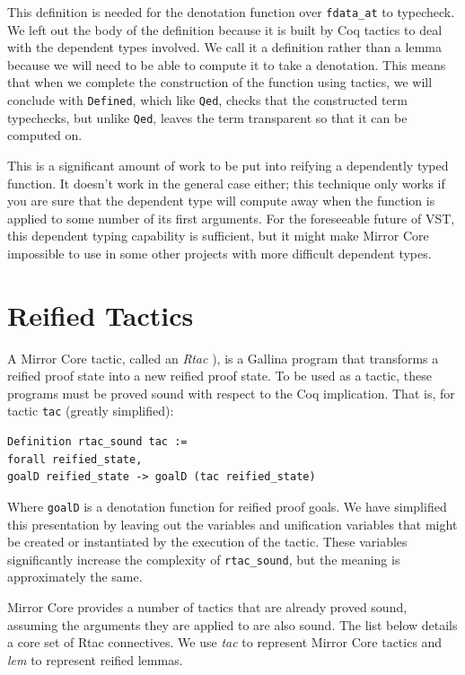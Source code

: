 \documentclass{puthesis}
\begin{document}
This definition is needed for the denotation function over
\lstinline|fdata_at| to typecheck.
We left out the body of the definition because it is built by Coq
tactics to deal with the dependent types involved. We call it a
definition rather than a lemma because we will need to be able to
compute it to take a denotation. This means that when we complete the
construction of the function using tactics, we will conclude with 
\lstinline|Defined|, which like \lstinline|Qed|, checks that the
constructed term typechecks, but unlike \lstinline|Qed|, leaves the
term transparent so that it can be computed on.

This is a significant
amount of work to be put into reifying a dependently typed
function. It doesn't work in the general case either; this technique
only works if you are sure that the dependent type will compute away
when the function is applied to some number of its first
arguments. For the foreseeable future of VST, this dependent typing
capability is sufficient, but it might make Mirror Core impossible to
use in some other projects with more difficult dependent types.

\section{Reified Tactics}

A Mirror Core tactic, called an \emph{Rtac} \cite[chapter
  6]{malecha:thesis}), is a Gallina program that transforms a reified
proof state into a new reified proof state. To be used as a tactic,
these programs must be proved sound with respect to the Coq
implication. That is, for tactic \lstinline|tac| (greatly simplified):

\begin{lstlisting}
Definition rtac_sound tac := 
forall reified_state,
goalD reified_state -> goalD (tac reified_state)
\end{lstlisting}

Where \lstinline|goalD| is a denotation function for reified proof
goals. We have simplified this presentation by leaving out the variables
and unification variables that might be created or instantiated by the
execution of the tactic. These variables significantly increase the
complexity of \lstinline|rtac_sound|, but the meaning is approximately the same.

Mirror Core provides a number of tactics that are already proved
sound, assuming the arguments they are applied to are also sound.  The
list below details a core set of Rtac connectives. We use {\it tac} to
represent Mirror Core tactics and {\it lem} to represent reified
lemmas.
\end{document}
